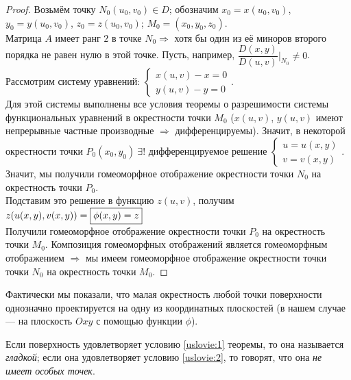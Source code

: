 \documentclass[a4paper,10pt]{article}
\begin{document}
	\begin{proof}
		Возьмём точку $N_0(u_0, v_0) \in D$; обозначим $x_0 = x(u_0, v_0)$, $y_0 = y(u_0, v_0)$, $z_0 = z(u_0, v_0)$; $M_0=(x_0, y_0, z_0)$. \\
		Матрица $A$ имеет ранг $2$ в точке $N_0 \Rightarrow$ хотя бы один из её миноров второго порядка не равен нулю в этой точке. Пусть, например, $\dfrac{D(x, y)}{D(u, v)}\bigg|_{N_0} \ne 0$. \\
		Рассмотрим систему уравнений: $\begin{cases}
		x(u, v) - x = 0 \\
		y(u, v) - y = 0
		\end{cases}$. \\
		Для этой системы выполнены все условия теоремы о разрешимости системы функциональных уравнений в окрестности точки $M_0$ ($x(u, v)$, $y(u, v)$ имеют непрерывные частные производные $\Rightarrow$ дифференцируемы). 
		Значит, в некоторой окрестности точки $P_0(x_0, y_0)~\exists!$ дифференцируемое решение $\begin{cases}
		u = u(x, y) \\
		v = v(x, y)
		\end{cases}$. \\
		Значит, мы получили гомеоморфное отображение окрестности точки $N_0$ на окрестность точки $P_0$. \\
		Подставим это решение в функцию $z(u, v)$, получим $z(u(x, y), v(x, y)) = \fbox{$\phi(x, y) = z$}$ \\ 
		Получили гомеоморфное отображение окрестности точки $P_0$ на окрестность точки $M_0$. Композиция гомеоморфных отображений является гомеоморфным отображением $\Rightarrow$ мы имеем гомеоморфное отображение окрестности точки точки $N_0$ на окрестность точки $M_0$.
	\end{proof}

	\begin{note}
		Фактически мы показали, что малая окрестность любой точки поверхности однозначно проектируется на одну из координатных плоскостей (в нашем случае --- на плоскость $Oxy$ с помощью функции $\phi$).
	\end{note}
	
	\begin{defn}
		Если поверхность удовлетворяет условию \ref{uslovie:1} теоремы, то она называется \textit{гладкой}; если она удовлетворяет условию \ref{uslovie:2}, то говорят, что она \textit{не имеет особых точек}.
	\end{defn}
	
\end{document}
